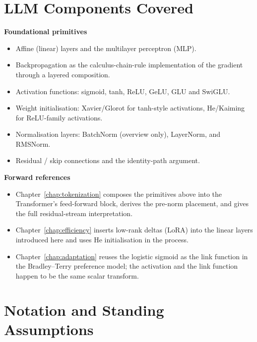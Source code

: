 \section{LLM Components Covered}

\textbf{Foundational primitives}
\begin{itemize}
  \item Affine (linear) layers and the multilayer perceptron (MLP).
  \item Backpropagation as the calculus-chain-rule implementation
        of the gradient through a layered composition.
  \item Activation functions: sigmoid, tanh, ReLU, GeLU, GLU and
        SwiGLU.
  \item Weight initialisation: Xavier/Glorot for tanh-style
        activations, He/Kaiming for ReLU-family activations.
  \item Normalisation layers: BatchNorm (overview only), LayerNorm,
        and RMSNorm.
  \item Residual / skip connections and the identity-path argument.
\end{itemize}

\textbf{Forward references}
\begin{itemize}
  \item Chapter~\ref{chap:tokenization} composes the primitives above into the
        Transformer's feed-forward block, derives the pre-norm
        placement, and gives the full residual-stream
        interpretation.
  \item Chapter~\ref{chap:efficiency} inserts low-rank deltas (LoRA) into the linear
        layers introduced here and uses He initialisation in the
        process.
  \item Chapter~\ref{chap:adaptation} reuses the logistic sigmoid as the link function
        in the Bradley--Terry preference model; the activation
        and the link function happen to be the same scalar
        transform.
\end{itemize}

\section{Notation and Standing Assumptions}
\label{sec:nn-notation}

